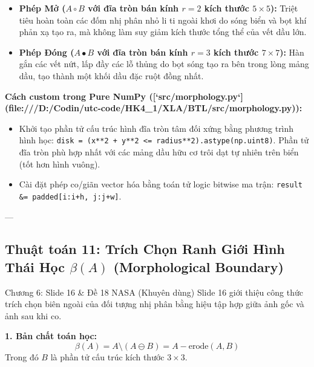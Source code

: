 \documentclass[11pt,a4paper]{article}
\begin{document}
\begin{whyuse}
\begin{itemize}
    \item \textbf{Phép Mở ($A \circ B$ với đĩa tròn bán kính $r=2$ kích thước $5 \times 5$):} Triệt tiêu hoàn toàn các đốm nhị phân nhỏ li ti ngoài khơi do sóng biển và bọt khí phản xạ tạo ra, mà không làm suy giảm kích thước tổng thể của vết dầu lớn.
    \item \textbf{Phép Đóng ($A \bullet B$ với đĩa tròn bán kính $r=3$ kích thước $7 \times 7$):} Hàn gắn các vết nứt, lấp đầy các lỗ thủng do bọt sóng tạo ra bên trong lòng mảng dầu, tạo thành một khối dầu đặc ruột đồng nhất.
\end{itemize}
\end{whyuse}

\begin{custombox}
\textbf{Cách custom trong Pure NumPy ([`src/morphology.py`](file:///D:/Codin/utc-code/HK4_1/XLA/BTL/src/morphology.py)):}
\begin{itemize}
    \item Khởi tạo phần tử cấu trúc hình đĩa tròn tâm đối xứng bằng phương trình hình học:
    \lstinline|disk = (x**2 + y**2 <= radius**2).astype(np.uint8)|. Phần tử đĩa tròn phù hợp nhất với các mảng dầu hữu cơ trôi dạt tự nhiên trên biển (tốt hơn hình vuông).
    \item Cài đặt phép co/giãn vector hóa bằng toán tử logic bitwise ma trận: \lstinline|result &= padded[i:i+h, j:j+w]|.
\end{itemize}
\end{custombox}

---

\subsection{Thuật toán 11: Trích Chọn Ranh Giới Hình Thái Học $\beta(A)$ (Morphological Boundary)}
\begin{slidemapping}{Chương 6: Slide 16 \& Đề 18 NASA (Khuyên dùng)}
Slide 16 giới thiệu công thức trích chọn biên ngoài của đối tượng nhị phân bằng hiệu tập hợp giữa ảnh gốc và ảnh sau khi co.
\end{slidemapping}

\textbf{1. Bản chất toán học:}
\begin{equation}
\beta(A) = A \setminus (A \ominus B) = A - \text{erode}(A, B)
\end{equation}
Trong đó $B$ là phần tử cấu trúc kích thước $3 \times 3$.
\end{document}
